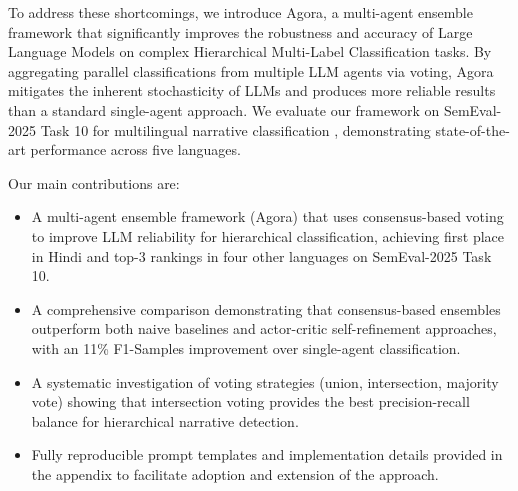 To address these shortcomings, we introduce Agora, a multi-agent ensemble framework that significantly improves the robustness and accuracy of Large Language Models on complex Hierarchical Multi-Label Classification tasks. By aggregating parallel classifications from multiple LLM agents via voting, Agora mitigates the inherent stochasticity of LLMs and produces more reliable results than a standard single-agent approach. We evaluate our framework on SemEval-2025 Task 10 for multilingual narrative classification \citep{semeval2025task10}, demonstrating state-of-the-art performance across five languages.

Our main contributions are:
\begin{itemize}
\item A multi-agent ensemble framework (Agora) that uses consensus-based voting to improve LLM reliability for hierarchical classification, achieving first place in Hindi and top-3 rankings in four other languages on SemEval-2025 Task 10.
\item A comprehensive comparison demonstrating that consensus-based ensembles outperform both naive baselines and actor-critic self-refinement approaches, with an 11\% F1-Samples improvement over single-agent classification.
\item A systematic investigation of voting strategies (union, intersection, majority vote) showing that intersection voting provides the best precision-recall balance for hierarchical narrative detection.
\item Fully reproducible prompt templates and implementation details provided in the appendix to facilitate adoption and extension of the approach.
\end{itemize}